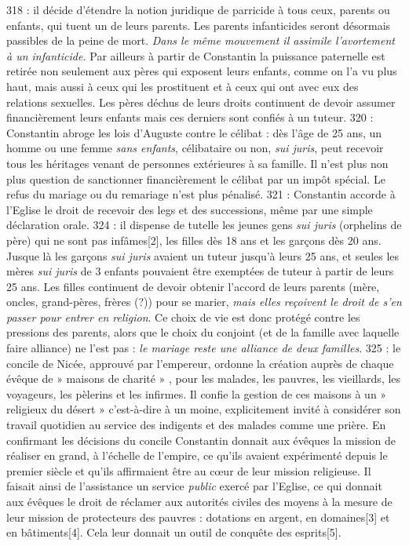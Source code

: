  318 : il décide d'étendre la notion juridique de parricide à tous ceux, parents ou enfants, qui tuent un de leurs parents. Les parents infanticides seront désormais passibles de la peine de mort. 
 \emph{Dans le même mouvement il assimile l'avortement à un infanticide.}
 Par ailleurs à partir de Constantin la puissance paternelle est retirée non seulement aux pères qui exposent leurs enfants, comme on l'a vu plus haut, mais aussi à ceux qui les prostituent et à ceux qui ont avec eux des relations sexuelles. Les pères déchus de leurs droits continuent de devoir assumer financièrement leurs enfants mais ces derniers sont confiés à un tuteur.
 320 : Constantin abroge les lois d'Auguste contre le célibat : dès l'âge de 25 ans, un homme ou une femme \emph{sans enfants}, célibataire ou non, \emph{sui juris}, peut recevoir tous les héritages venant de personnes extérieures à sa famille. Il n'est plus non plus question de sanctionner financièrement le célibat par un impôt spécial. Le refus du mariage ou du remariage n'est plus pénalisé.
 321 : Constantin accorde à l'Eglise le droit de recevoir des legs et des successions, même par une simple déclaration orale. 
 324 : il dispense de tutelle les jeunes gens \emph{sui juris} (orphelins de père) qui ne sont pas infâmes[2], les filles dès 18 ans et les garçons dès 20 ans. Jusque là les garçons \emph{sui juris} avaient un tuteur jusqu'à leurs 25 ans, et seules les mères \emph{sui juris} de 3 enfants pouvaient être exemptées de tuteur à partir de leurs 25 ans. Les filles continuent de devoir obtenir l'accord de leurs parents (mère, oncles, grand-pères, frères (?)) pour se marier, \emph{mais elles reçoivent le droit de s'en passer pour entrer en religion}. Ce choix de vie est donc protégé contre les pressions des parents, alors que le choix du conjoint (et de la famille avec laquelle faire alliance) ne l'est pas : \emph{le mariage reste une alliance de deux familles}.
 325 : le concile de Nicée, approuvé par l'empereur, ordonne la création auprès de chaque évêque de » maisons de charité » , pour les malades, les pauvres, les vieillards, les voyageurs, les pèlerins et les infirmes. Il confie la gestion de ces maisons à un » religieux du désert » c'est-à-dire à un moine, explicitement invité à considérer son travail quotidien au service des indigents et des malades comme une prière. En confirmant les décisions du concile Constantin donnait aux évêques la mission de réaliser en grand, à l'échelle de l'empire, ce qu'ils avaient expérimenté depuis le premier siècle et qu'ils affirmaient être au cœur de leur mission religieuse. Il faisait ainsi de l'assistance un service \emph{public} exercé par l'Eglise, ce qui donnait aux évêques le droit de réclamer aux autorités civiles des moyens à la mesure de leur mission de protecteurs des pauvres : dotations en argent, en domaines[3] et en bâtiments[4]. Cela leur donnait un outil de conquête des esprits[5]. 
